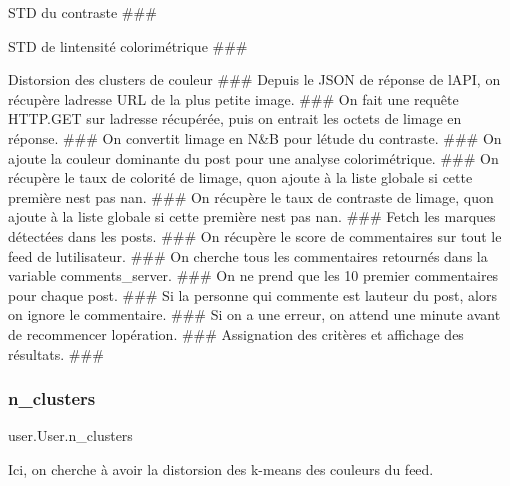 \begin{DoxyItemize}
\item S\+TD du contraste \#\#\#
\item S\+TD de l\textquotesingle{}intensité colorimétrique \#\#\#
\item Distorsion des clusters de couleur \#\#\# Depuis le J\+S\+ON de réponse de l\textquotesingle{}A\+PI, on récupère l\textquotesingle{}adresse U\+RL de la plus petite image. \#\#\# On fait une requête H\+T\+T\+P.\+G\+ET sur l\textquotesingle{}adresse récupérée, puis on entrait les octets de l\textquotesingle{}image en réponse. \#\#\# On convertit l\textquotesingle{}image en N\&B pour l\textquotesingle{}étude du contraste. \#\#\# On ajoute la couleur dominante du post pour une analyse colorimétrique. \#\#\# On récupère le taux de colorité de l\textquotesingle{}image, qu\textquotesingle{}on ajoute à la liste globale si cette première n\textquotesingle{}est pas nan. \#\#\# On récupère le taux de contraste de l\textquotesingle{}image, qu\textquotesingle{}on ajoute à la liste globale si cette première n\textquotesingle{}est pas nan. \#\#\# Fetch les marques détectées dans les posts. \#\#\# On récupère le score de commentaires sur tout le feed de l\textquotesingle{}utilisateur. \#\#\# On cherche tous les commentaires retournés dans la variable {\ttfamily comments\+\_\+server}. \#\#\# On ne prend que les 10 premier commentaires pour chaque post. \#\#\# Si la personne qui commente est l\textquotesingle{}auteur du post, alors on ignore le commentaire. \#\#\# Si on a une erreur, on attend une minute avant de recommencer l\textquotesingle{}opération. \#\#\# Assignation des critères et affichage des résultats. \#\#\# 
\end{DoxyItemize}\mbox{\label{classuser_1_1_user_ad3a0ba5c1d994eef3cc7a0c5de2bfa85}} 
\subsubsection{\texorpdfstring{n\+\_\+clusters}{n\_clusters}}
{\footnotesize\ttfamily user.\+User.\+n\+\_\+clusters}



Ici, on cherche à avoir la distorsion des k-\/means des couleurs du feed. 

\paragraph*{}

